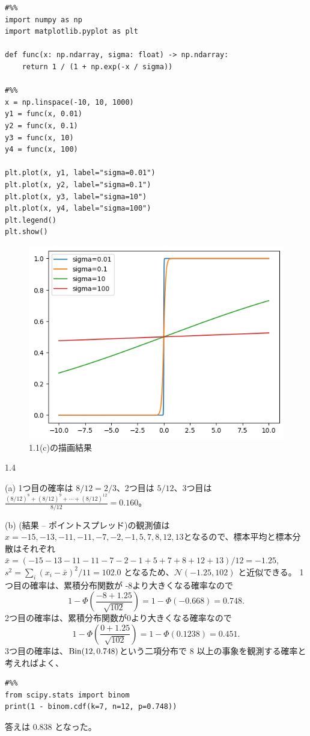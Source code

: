 \documentclass[pdflatex,ja=standard]{bxjsarticle}
\begin{document}
\begin{lstlisting}
#%%
import numpy as np
import matplotlib.pyplot as plt

def func(x: np.ndarray, sigma: float) -> np.ndarray:
    return 1 / (1 + np.exp(-x / sigma))

#%% 
x = np.linspace(-10, 10, 1000)
y1 = func(x, 0.01)
y2 = func(x, 0.1)
y3 = func(x, 10)
y4 = func(x, 100)

plt.plot(x, y1, label="sigma=0.01")
plt.plot(x, y2, label="sigma=0.1")
plt.plot(x, y3, label="sigma=10")
plt.plot(x, y4, label="sigma=100")
plt.legend()
plt.show()
\end{lstlisting}

\begin{figure}
    \centering
    \includegraphics[width=0.5\linewidth]{output_sigmoid_like.png}
    \caption{1.1(c)の描画結果}
    \label{fig:placeholder}
\end{figure}

1.4

(a) 1つ目の確率は $8/12 = 2/3$、2つ目は $5/12$、3つ目は $\frac{(8/12)^8+(8/12)^9 + \cdots + (8/12)^{12}}{8/12} = 0.160$。

(b) (結果 -- ポイントスプレッド)の観測値は $x=-15,-13,-11,-11,-7,-2,-1,5,7,8,12,13$となるので、標本平均と標本分散はそれぞれ $\bar{x}=(-15-13-11-11-7-2-1+5+7+8+12+13)/12=-1.25$, $s^2 = \sum_i(x_i-\bar{x})^2/11=102.0$ となるため、$\mathcal{N} (-1.25, 102)$ と近似できる。
1つ目の確率は、累積分布関数が -8より大きくなる確率なので 
\begin{equation}
    1-\Phi(\frac{-8+1.25}{\sqrt{102}}) = 1- \Phi(-0.668) = 0.748.
\end{equation}
2つ目の確率は、累積分布関数が0より大きくなる確率なので
\begin{equation}
    1-\Phi(\frac{0+1.25}{\sqrt{102}}) = 1- \Phi(0.1238) = 0.451.
\end{equation}
3つ目の確率は、$\rm{Bin}(12, 0.748)$という二項分布で 8 以上の事象を観測する確率と考えればよく、
\begin{lstlisting}
#%% 
from scipy.stats import binom
print(1 - binom.cdf(k=7, n=12, p=0.748))
\end{lstlisting}
答えは 0.838 となった。
\end{document}
